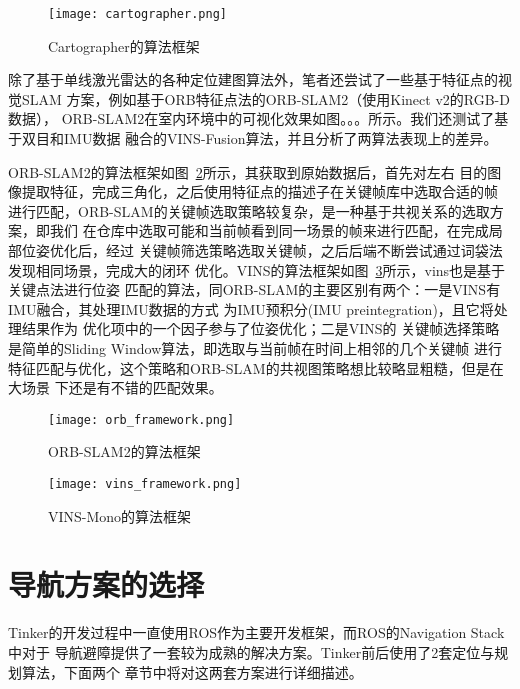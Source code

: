 \begin{figure}[h] %
  \centering
  \texttt{[image: cartographer.png]}
  \caption{Cartographer的算法框架}
  \label{fig:cartographer}
\end{figure}

除了基于单线激光雷达的各种定位建图算法外，笔者还尝试了一些基于特征点的视觉SLAM
方案，例如基于ORB特征点法的ORB-SLAM2（使用Kinect v2的RGB-D数据）\cite{mur2015orb}，
ORB-SLAM2在室内环境中的可视化效果如图。。。所示。我们还测试了基于双目和IMU数据
融合的VINS-Fusion\cite{qin2018vins}算法，并且分析了两算法表现上的差异。

ORB-SLAM2的算法框架如图~\ref{fig:orb_frame}所示，其获取到原始数据后，首先对左右
目的图像提取特征，完成三角化，之后使用特征点的描述子在关键帧库中选取合适的帧
进行匹配，ORB-SLAM的关键帧选取策略较复杂，是一种基于共视关系的选取方案，即我们
在仓库中选取可能和当前帧看到同一场景的帧来进行匹配，在完成局部位姿优化后，经过
关键帧筛选策略选取关键帧，之后后端不断尝试通过词袋法发现相同场景，完成大的闭环
优化。VINS的算法框架如图~\ref{fig:vins_frame}所示，vins也是基于关键点法进行位姿
匹配的算法，同ORB-SLAM的主要区别有两个：一是VINS有IMU融合，其处理IMU数据的方式
为IMU预积分(IMU preintegration)\cite{forster2015manifold}，且它将处理结果作为
优化项中的一个因子参与了位姿优化；二是VINS的
关键帧选择策略是简单的Sliding Window算法，即选取与当前帧在时间上相邻的几个关键帧
进行特征匹配与优化，这个策略和ORB-SLAM的共视图策略想比较略显粗糙，但是在大场景
下还是有不错的匹配效果。


\begin{figure}[h] %
  \centering
  \texttt{[image: orb\_framework.png]}
  \caption{ORB-SLAM2的算法框架}
  \label{fig:orb_frame}
\end{figure}


\begin{figure}[h] %
  \centering
  \texttt{[image: vins\_framework.png]}
  \caption{VINS-Mono的算法框架}
  \label{fig:vins_frame}
\end{figure}

\section{导航方案的选择}

Tinker的开发过程中一直使用ROS作为主要开发框架，而ROS的Navigation Stack中对于
导航避障提供了一套较为成熟的解决方案。Tinker前后使用了2套定位与规划算法，下面两个
章节中将对这两套方案进行详细描述。


